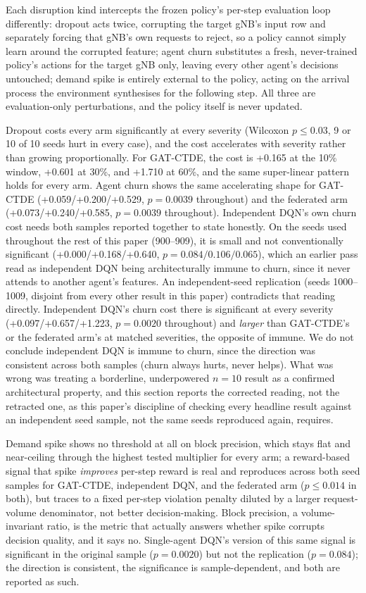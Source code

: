 \documentclass[pdflatex,sn-basic,Numbered]{sn-jnl}%
\begin{document}
Each disruption kind intercepts the frozen policy's per-step
evaluation loop differently: dropout acts twice, corrupting the target
gNB's input row and separately forcing that gNB's own requests to
reject, so a policy cannot simply learn around the corrupted feature;
agent churn substitutes a fresh, never-trained policy's actions for
the target gNB only, leaving every other agent's decisions untouched;
demand spike is entirely external to the policy, acting on the
arrival process the environment synthesises for the following step.
All three are evaluation-only perturbations, and the policy itself is never updated.

Dropout costs every arm significantly at every severity (Wilcoxon $p\leq0.03$, 9 or 10 of 10 seeds hurt in every case), and the cost accelerates with severity rather than growing proportionally. For GAT-CTDE, the cost is +0.165 at the 10\% window, +0.601 at 30\%, and +1.710 at 60\%, and the same super-linear pattern holds for every arm. Agent churn shows
the same accelerating shape for GAT-CTDE (+0.059/+0.200/+0.529,
$p=0.0039$ throughout) and the federated arm (+0.073/+0.240/+0.585,
$p=0.0039$ throughout). Independent DQN's own churn cost needs both samples reported together to state honestly. On the seeds used throughout the rest of this paper (900--909), it is small and not conventionally significant (+0.000/+0.168/+0.640, $p=0.084/0.106/0.065$), which an earlier pass read as independent DQN being architecturally immune to churn, since it never attends to another agent's features. An independent-seed replication (seeds 1000--1009, disjoint from every other result in this paper) contradicts that reading directly. Independent DQN's churn cost there is significant at every severity (+0.097/+0.657/+1.223, $p=0.0020$ throughout) and \emph{larger} than GAT-CTDE's or the federated arm's at matched severities, the opposite of immune. We do not conclude independent DQN is immune to churn, since the direction was consistent across both samples (churn always hurts, never helps). What was wrong was treating a borderline, underpowered $n=10$ result as a confirmed architectural property, and this section reports the corrected reading, not the retracted one, as this paper's discipline of checking every headline result against an independent seed sample, not the same seeds reproduced again, requires.

Demand spike shows no threshold at all on block precision, which stays
flat and near-ceiling through the highest tested multiplier for every
arm; a reward-based signal that spike \emph{improves} per-step reward
is real and reproduces across both seed samples for GAT-CTDE,
independent DQN, and the federated arm ($p\leq0.014$ in both), but traces to a fixed per-step violation penalty diluted by a larger request-volume denominator, not better decision-making. Block precision, a volume-invariant ratio, is the metric that actually answers whether spike corrupts decision quality, and it says no.
Single-agent DQN's version of this same signal is significant in the original sample ($p=0.0020$) but not the replication ($p=0.084$); the direction is consistent, the significance is sample-dependent, and both are reported as such.
\end{document}
